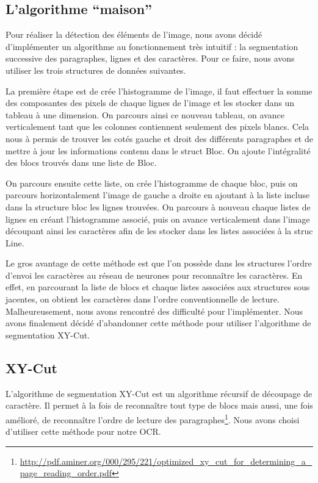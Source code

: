 \documentclass[11pt]{report}
\begin{document}
\subsection{L'algorithme ``maison''}

Pour réaliser la détection des éléments de l'image, nous avons décidé d’implémenter un algorithme au fonctionnement très intuitif : la segmentation successive des paragraphes, lignes et des caractères. Pour ce faire, nous avons utiliser les trois structures de données suivantes.

\bigskip


La première étape est de crée l'histogramme de l'image, il faut effectuer la somme des composantes des pixels de chaque lignes de l'image et les stocker dans un tableau à une dimension. On parcours ainsi ce nouveau tableau, on avance verticalement tant que les colonnes contiennent seulement des pixels blancs. Cela nous à permis de trouver les cotés gauche et droit des différents paragraphes et de mettre à jour les informations contenu dans le struct Bloc. On ajoute l'intégralité des blocs trouvés dans une liste de Bloc.

On parcours ensuite cette liste, on crée l'histogramme de chaque bloc, puis on parcours horizontalement l'image de gauche a droite en ajoutant à la liste incluse dans la structure bloc les lignes trouvées. On parcours à nouveau chaque listes de lignes en créant l'histogramme associé, puis on avance verticalement dans l'image découpant ainsi les caractères afin de les stocker dans les listes associées à la struc Line.

Le gros avantage de cette méthode est que l'on possède dans les structures l'ordre d'envoi les caractères au réseau de neurones pour reconnaître les caractères. En effet, en parcourant la liste de blocs et chaque listes associées aux structures sous jacentes, on obtient les caractères dans l'ordre conventionnelle de lecture. Malheureusement, nous avons rencontré des difficulté pour l'implémenter. Nous avons finalement décidé d'abandonner cette méthode pour utiliser l'algorithme de segmentation XY-Cut.

\subsection{XY-Cut}

L'algorithme de segmentation XY-Cut est un algorithme récursif de découpage de caractère. Il permet à la fois de reconnaître tout type de blocs mais aussi, une fois amélioré, de reconnaître l'ordre de lecture des paragraphes\footnote{\url{http://pdf.aminer.org/000/295/221/optimized_xy_cut_for_determining_a_page_reading_order.pdf}}. Nous avons choisi d'utiliser cette méthode pour notre OCR.
\end{document}
